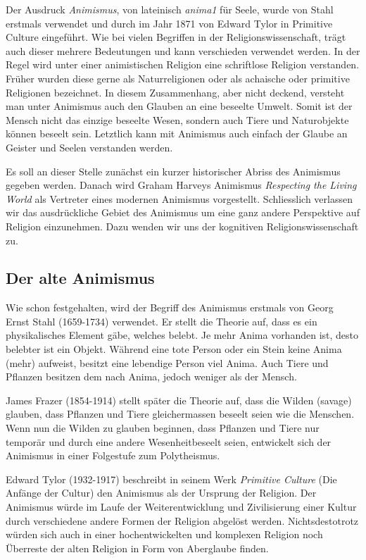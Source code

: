 Der Ausdruck \emph{Animismus}, von lateinisch \emph{anima1} für Seele, wurde von Stahl erstmals verwendet und durch im Jahr 1871 von Edward Tylor in Primitive Culture eingeführt. Wie bei vielen Begriffen in der Religionswissenschaft, trägt auch dieser mehrere Bedeutungen und kann verschieden verwendet werden. In der Regel wird unter einer animistischen Religion eine schriftlose Religion verstanden. Früher wurden diese gerne als Naturreligionen oder als achaische oder primitive Religionen bezeichnet. In diesem Zusammenhang, aber nicht deckend, versteht man unter Animismus auch den Glauben an eine beseelte Umwelt. Somit ist der Mensch nicht das einzige beseelte Wesen, sondern auch Tiere und Naturobjekte können beseelt sein. Letztlich kann mit Animismus auch einfach der Glaube an Geister und Seelen verstanden werden.

Es soll an dieser Stelle zunächst ein kurzer historischer Abriss des Animismus gegeben werden. Danach wird Graham Harveys Animismus \emph{Respecting the Living World} als Vertreter eines modernen Animismus vorgestellt. Schliesslich verlassen wir das ausdrückliche Gebiet des Animismus um eine ganz andere Perspektive auf Religion einzunehmen. Dazu wenden wir uns der kognitiven Religionswissenschaft zu. 

\subsection{Der alte Animismus}

Wie schon festgehalten, wird der Begriff des Animismus erstmals von Georg Ernst Stahl (1659-1734) verwendet. Er stellt die Theorie auf, dass es ein physikalisches Element gäbe, welches belebt. Je mehr Anima vorhanden ist, desto belebter ist ein Objekt. Während eine tote Person oder ein Stein keine Anima (mehr) aufweist, besitzt eine lebendige Person viel Anima. Auch Tiere und Pflanzen besitzen dem nach Anima, jedoch weniger als der Mensch.

James Frazer (1854-1914) stellt später die Theorie auf, dass die Wilden (savage) glauben, dass Pflanzen und Tiere gleichermassen beseelt seien wie die Menschen. Wenn nun die Wilden zu glauben beginnen, dass Pflanzen und Tiere nur temporär und durch eine andere Wesenheitbeseelt seien, entwickelt sich der Animismus in einer Folgestufe zum Polytheismus. 

Edward Tylor (1932-1917) beschreibt in seinem Werk \emph{Primitive Culture} (Die Anfänge der Cultur) den Animismus als der Ursprung der Religion. Der Animismus würde im Laufe der Weiterentwicklung und Zivilisierung einer Kultur durch verschiedene andere Formen der Religion abgelöst werden. Nichtsdestotrotz würden sich auch in einer hochentwickelten und komplexen Religion noch Überreste der alten Religion in Form von Aberglaube finden.

